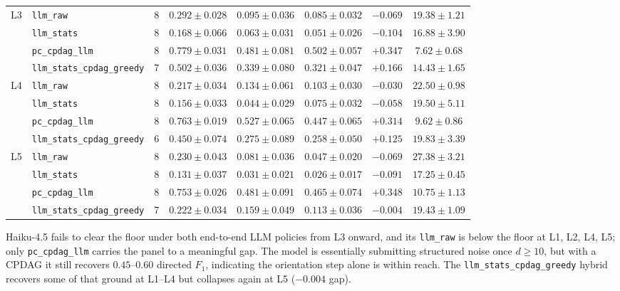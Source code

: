 \begin{center}
\begin{tabular}{@{}l l c c c c c c@{}}
\midrule
L3 & \texttt{llm\_raw}                & 8 & $0.292 \pm 0.028$ & $0.095 \pm 0.036$ & $0.085 \pm 0.032$ & $-0.069$ & $19.38 \pm 1.21$ \\
   & \texttt{llm\_stats}              & 8 & $0.168 \pm 0.066$ & $0.063 \pm 0.031$ & $0.051 \pm 0.026$ & $-0.104$ & $16.88 \pm 3.90$ \\
   & \texttt{pc\_cpdag\_llm}          & 8 & $0.779 \pm 0.031$ & $0.481 \pm 0.081$ & $0.502 \pm 0.057$ & $+0.347$ & $7.62 \pm 0.68$ \\
   & \texttt{llm\_stats\_cpdag\_greedy} & 7 & $0.502 \pm 0.036$ & $0.339 \pm 0.080$ & $0.321 \pm 0.047$ & $+0.166$ & $14.43 \pm 1.65$ \\
\midrule
L4 & \texttt{llm\_raw}                & 8 & $0.217 \pm 0.034$ & $0.134 \pm 0.061$ & $0.103 \pm 0.030$ & $-0.030$ & $22.50 \pm 0.98$ \\
   & \texttt{llm\_stats}              & 8 & $0.156 \pm 0.033$ & $0.044 \pm 0.029$ & $0.075 \pm 0.032$ & $-0.058$ & $19.50 \pm 5.11$ \\
   & \texttt{pc\_cpdag\_llm}          & 8 & $0.763 \pm 0.019$ & $0.527 \pm 0.065$ & $0.447 \pm 0.065$ & $+0.314$ & $9.62 \pm 0.86$ \\
   & \texttt{llm\_stats\_cpdag\_greedy} & 6 & $0.450 \pm 0.074$ & $0.275 \pm 0.089$ & $0.258 \pm 0.050$ & $+0.125$ & $19.83 \pm 3.39$ \\
\midrule
L5 & \texttt{llm\_raw}                & 8 & $0.230 \pm 0.043$ & $0.081 \pm 0.036$ & $0.047 \pm 0.020$ & $-0.069$ & $27.38 \pm 3.21$ \\
   & \texttt{llm\_stats}              & 8 & $0.131 \pm 0.037$ & $0.031 \pm 0.021$ & $0.026 \pm 0.017$ & $-0.091$ & $17.25 \pm 0.45$ \\
   & \texttt{pc\_cpdag\_llm}          & 8 & $0.753 \pm 0.026$ & $0.481 \pm 0.091$ & $0.465 \pm 0.074$ & $+0.348$ & $10.75 \pm 1.13$ \\
   & \texttt{llm\_stats\_cpdag\_greedy} & 7 & $0.222 \pm 0.034$ & $0.159 \pm 0.049$ & $0.113 \pm 0.036$ & $-0.004$ & $19.43 \pm 1.09$ \\
\bottomrule
\end{tabular}
\end{center}

Haiku-4.5 fails to clear the floor under both end-to-end LLM policies from L3 onward, and its \texttt{llm\_raw} is below the floor at L1, L2, L4, L5; only \texttt{pc\_cpdag\_llm} carries the panel to a meaningful gap. The model is essentially submitting structured noise once $d \ge 10$, but with a CPDAG it still recovers $0.45$--$0.60$ directed $F_1$, indicating the orientation step alone is within reach. The \texttt{llm\_stats\_cpdag\_greedy} hybrid recovers some of that ground at L1--L4 but collapses again at L5 ($-0.004$ gap).


